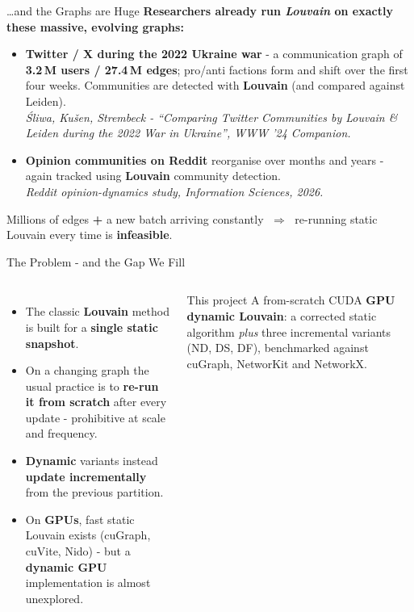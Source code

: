 \documentclass[aspectratio=169]{beamer}
\begin{document}
\begin{frame}{\dots and the Graphs are Huge}
    \textbf{Researchers already run \emph{Louvain} on exactly these massive, evolving graphs:}
    \vspace{0.6em}
    \begin{itemize}
        \item \textbf{Twitter / X during the 2022 Ukraine war} - a communication graph of
        \textbf{3.2\,M users / 27.4\,M edges}; pro/anti factions form and shift over the first
        four weeks. Communities are detected with \textbf{Louvain} (and compared against
        Leiden).\\[-0.1em]
        {\scriptsize\itshape \'Sliwa, Ku\v{s}en, Strembeck - ``Comparing Twitter Communities
        by Louvain \& Leiden during the 2022 War in Ukraine'', WWW '24 Companion.}
        \item \textbf{Opinion communities on Reddit} reorganise over months and years -
        again tracked using \textbf{Louvain} community detection.\\[-0.1em]
        {\scriptsize\itshape Reddit opinion-dynamics study, \emph{Information Sciences}, 2026.}
    \end{itemize}
    \vspace{0.6em}
    \begin{center}
    Millions of edges \textbf{+} a new batch arriving constantly
    $\;\Rightarrow\;$ re-running static Louvain every time is \textbf{infeasible}.
    \end{center}
\end{frame}

\begin{frame}{The Problem - and the Gap We Fill}
    \begin{columns}
        \begin{itemize}
            \item The classic \textbf{Louvain} method is built for a \textbf{single static
            snapshot}.
            \item On a changing graph the usual practice is to \textbf{re-run it from scratch}
            after every update - prohibitive at scale and frequency.
            \item \textbf{Dynamic} variants instead \textbf{update incrementally} from the
            previous partition.
            \item On \textbf{GPUs}, fast static Louvain exists (cuGraph, cuVite, Nido) - but
            a \textbf{dynamic GPU} implementation is almost unexplored.
        \end{itemize}
        \begin{alertblock}{This project}
        A from-scratch CUDA \textbf{GPU dynamic Louvain}: a corrected static algorithm
        \emph{plus} three incremental variants (ND, DS, DF), benchmarked against
        cuGraph, NetworKit and NetworkX.
        \end{alertblock}
    \end{columns}
\end{frame}
\end{document}
